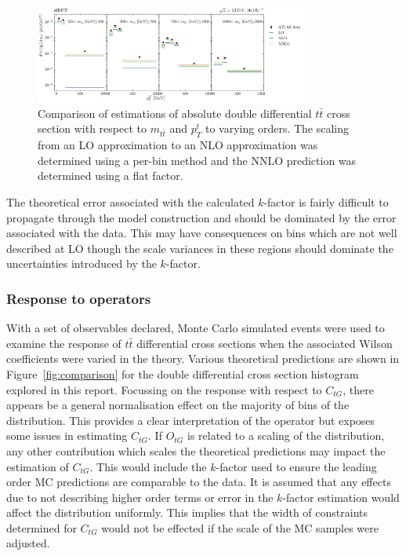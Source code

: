 \documentclass[a4paper,11pt]{article}
\begin{document}
\begin{figure}[H]
    \centering
    \includegraphics[width=0.8\textwidth]{plots/k_factor.png}
    \caption{Comparison of estimations of absolute double differential $t\bar{t}$ cross section with respect to $m_{t\bar{t}}$ and $p_{T}^{t}$ to varying orders. The scaling from an LO approximation to an NLO approximation was determined using a per-bin method and the NNLO prediction was determined using a flat factor.}
    \label{fig:kfactor}
\end{figure}

The theoretical error associated with the calculated $k$-factor is fairly difficult to propagate through the model construction and should be dominated by the error associated with the data.
This may have consequences on bins which are not well described at LO though the scale variances in these regions should dominate the uncertainties introduced by the $k$-factor.


\subsubsection{Response to operators}\label{sec:response}

With a set of observables declared, Monte Carlo simulated events were used to examine the response of $t\bar{t}$ differential cross sections when the associated Wilson coefficients were varied in the theory.
Various theoretical predictions are shown in Figure~\ref{fig:comparison} for the double differential cross section histogram explored in this report.
Focussing on the response with respect to $C_{tG}$, there appears be a general normalisation effect on the majority of bins of the distribution.
This provides a clear interpretation of the operator but exposes some issues in estimating $C_{tG}$.
If $O_{tG}$ is related to a scaling of the distribution, any other contribution which scales the theoretical predictions may impact the estimation of $C_{tG}$.
This would include the $k$-factor used to ensure the leading order MC predictions are comparable to the data.
It is assumed that any effects due to not describing higher order terms or error in the $k$-factor estimation would affect the distribution uniformly.
This implies that the width of constraints determined for $C_{tG}$ would not be effected if the scale of the MC samples were adjusted.
\end{document}
